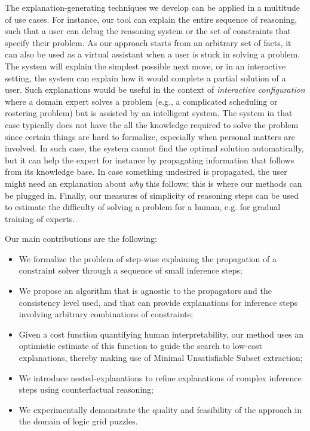 The explanation-generating techniques we develop can be applied in a multitude of use cases. 
For instance, our tool can explain the entire sequence of reasoning, such that a user can debug the reasoning system or the set of constraints that specify their problem. 
As our approach starts from an arbitrary set of facts, it can also be used as a virtual assistant when a user is stuck in solving a problem.
The system will explain the simplest possible next move, or in an interactive setting, the system can explain how it would complete a partial solution of a user. Such explanations would be useful in the context of  \emph{interactive configuration} \cite{felfernig2014knowledge} where a domain expert solves a problem (e.g., a complicated scheduling or rostering problem) but is assisted by an intelligent system. 
The system in that case typically does not have the all the knowledge required to solve the problem since certain things are hard to formalize, especially when personal matters are involved. In such case, the system cannot find the optimal solution automatically, but it can help the expert for instance by propagating information that follows from its knowledge base. In case something undesired is propagated, the user might need an explanation about \emph{why} this follows; this is where our methods can be plugged in.
% 
% 
Finally, our measures of simplicity of reasoning steps can be used to estimate the difficulty of solving a problem for a human, e.g. for gradual training of experts.


Our main contributions are the following:
\begin{itemize}
	\item We formalize the problem of step-wise explaining the propagation of a constraint solver through a sequence of small inference steps;
	\item We propose an algorithm that is agnostic to the propagators and the consistency level used, and that can provide explanations for inference steps involving arbitrary combinations of constraints;
	\item Given a cost function quantifying human interpretability, our method uses an optimistic estimate of this function to guide the search to low-cost explanations, thereby making use of Minimal Unsatisfiable Subset extraction;
	\item We introduce nested-explanations to refine explanations of complex inference steps using counterfactual reasoning; 
	\item We experimentally demonstrate the quality and feasibility of the approach in the domain of logic grid puzzles.
\end{itemize}


